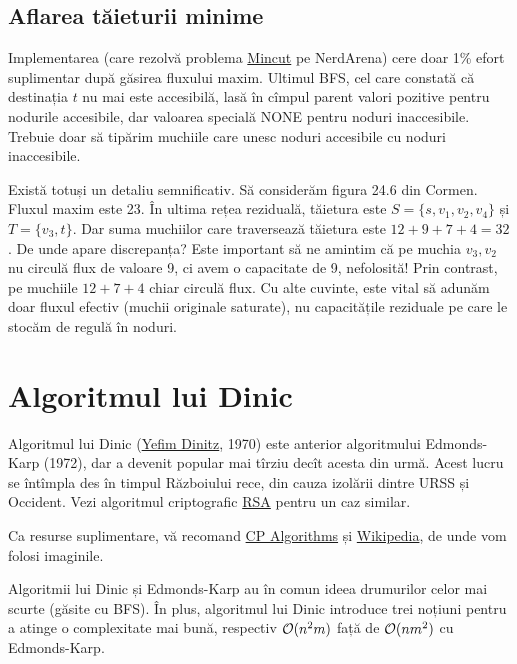 \documentclass[../main.tex]{subfiles}
\begin{document}
\subsection{Aflarea tăieturii minime}

Implementarea (care rezolvă problema \href{https://www.nerdarena.ro/problema/mincut}{Mincut} pe NerdArena) cere doar 1\% efort suplimentar după găsirea fluxului maxim. Ultimul BFS, cel care constată că destinația $t$ nu mai este accesibilă, lasă în cîmpul parent valori pozitive pentru nodurile accesibile, dar valoarea specială NONE pentru noduri inaccesibile. Trebuie doar să tipărim muchiile care unesc noduri accesibile cu noduri inaccesibile.

Există totuși un detaliu semnificativ. Să considerăm figura 24.6 din Cormen. Fluxul maxim este 23. În ultima rețea reziduală, tăietura este $S = \{s, v_1, v_2, v_4\}$ și $T = \{v_3, t\}$. Dar suma muchiilor care traversează tăietura este $12 + 9 + 7 + 4 = 32$. De unde apare discrepanța? Este important să ne amintim că pe muchia $v_3, v_2$ nu circulă flux de valoare 9, ci avem o capacitate de 9, nefolosită! Prin contrast, pe muchiile $12 + 7 + 4$ chiar circulă flux. Cu alte cuvinte, este vital să adunăm doar fluxul efectiv (muchii originale saturate), nu capacitățile reziduale pe care le stocăm de regulă în noduri.


\section{Algoritmul lui Dinic}

Algoritmul lui Dinic (\href{https://en.wikipedia.org/wiki/Yefim_Dinitz}{Yefim Dinitz}, 1970) este anterior algoritmului Edmonds-Karp (1972), dar a devenit popular mai tîrziu decît acesta din urmă. Acest lucru se întîmpla des în timpul Războiului rece, din cauza izolării dintre URSS și Occident. Vezi algoritmul criptografic \href{https://en.wikipedia.org/wiki/RSA_cryptosystem}{RSA} pentru un caz similar.

Ca resurse suplimentare, vă recomand \href{https://cp-algorithms.com/graph/dinic.html}{CP Algorithms} și \href{https://en.wikipedia.org/wiki/Dinic\%27s_algorithm}{Wikipedia}, de unde vom folosi imaginile.

Algoritmii lui Dinic și Edmonds-Karp au în comun ideea drumurilor celor mai scurte (găsite cu BFS). În plus, algoritmul lui Dinic introduce trei noțiuni pentru a atinge o complexitate mai bună, respectiv $\mathcal{O}(n^2 m)$ față de $\mathcal{O}(n m^2)$ cu Edmonds-Karp.
\end{document}
